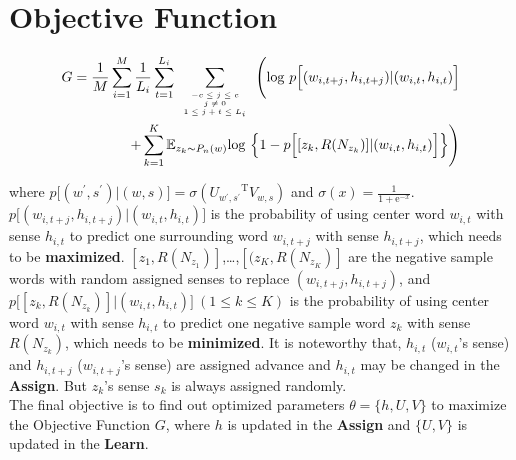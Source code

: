 \section{Objective Function}
\begin{equation}
\begin{split}
G = \frac{1}{M}\sum_{i=1}^M\frac{1}{L_i}\sum_{t=1}^{L_i}\sum\limits_{\mbox{\tiny$\begin{array}{c}-c\leq j \leq c\\ j\neq 0\\ 1\leq j+t\leq L_i\end{array}$}}\Bigg (\mathrm{log}\ p\Big [(w_{i,t+j},h_{i,t+j})|(w_{i,t},h_{i,t})\Big ] \\
+\sum\limits_{k=1}^K\mathbb{E}_{z_k\sim P_n(w)}\mathrm{log}\ \Big \{1-p\Big[[z_k,R(N_{z_k})]|(w_{i,t},h_{i,t})\Big ] \Big \} \Bigg )
\end{split}
\end{equation} 

where $p\Big[(w^\prime,s^\prime)|(w,s)\Big] = \sigma({U_{w^\prime,s^\prime}}^{\mathrm{T}}V_{w,s})$
 and $\sigma(x) = \frac{1}{1+\mathrm{e}^{-x}}$. \\
 
 $p\Big [(w_{i,t+j},h_{i,t+j})|(w_{i,t},h_{i,t})\Big ]$ is the probability of using center word $w_{i,t}$ with sense $h_{i,t}$ to predict one surrounding word $w_{i,t+j}$ with sense $h_{i,t+j}$, which needs to be \textbf{maximized}.
$[z_1,R(N_{z_1})]$,\ldots,$[(z_K,R(N_{z_K})]$ are the negative sample words with random assigned senses to replace $(w_{i,t+j},h_{i,t+j})$, and $p\Big[[z_k,R(N_{z_k})]|(w_{i,t},h_{i,t})\Big ]\ (1\leq k\leq K)$ is the probability of using center word $w_{i,t}$ with sense $h_{i,t}$ to predict one negative sample word $z_k$ with sense $R(N_{z_k})$, which needs to be \textbf{minimized}. 
It is noteworthy that, $h_{i,t}$  ($w_{i,t}$'s sense) and $h_{i,t+j}$ ($w_{i,t+j}$'s sense) are assigned advance and $h_{i,t}$ may be changed in the \textbf{Assign}. But $z_k$'s sense $s_k$ is always assigned randomly. \\

The final objective is to find out optimized parameters $\theta = \{h,U,V\}$ to maximize the Objective Function $G$, where $h$ is updated in the \textbf{Assign} and $\{U,V\}$ is updated in the \textbf{Learn}.\\

